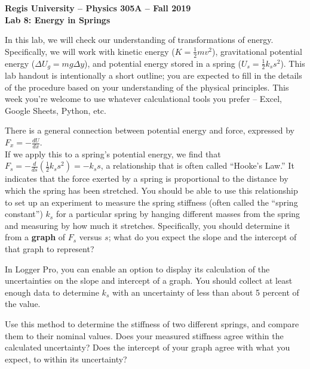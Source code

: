 \documentclass[12pt]{article}
\begin{document}
\begin{center}
{\bf{Regis University -- Physics 305A -- Fall 2019}} \\
{\bf{Lab 8: Energy in Springs}} \\
\medskip
\end{center}

\medskip

In this lab, we will check our understanding of transformations of 
energy. Specifically, we will work with kinetic 
energy ($K = \frac{1}{2} m v^2$), gravitational potential 
energy ($\Delta U_g = m g \Delta y$), and potential energy stored in a 
spring ($U_s = \frac{1}{2} k_s s^2$).  This lab handout is 
intentionally a short outline; you are expected to fill in the 
details of the procedure based on your understanding of the physical
principles. This week you're welcome to use whatever calculational tools you prefer -- Excel, Google Sheets, Python, etc.

\bigskip


\medskip

There is a general connection between potential energy and force,
expressed by $F_x = - \frac{d U} {d x}$.  \\
If we apply this to a spring's potential energy, we find that 
$F_s = - \frac{d}{d s} (\frac{1}{2} k_s s^2) = - k_s s$, a relationship
that is often called ``Hooke's Law.''  It indicates that the force
exerted by a spring is proportional to the distance by which the spring
has been stretched.
You should be able to use this relationship to set up an experiment 
to measure the spring stiffness (often called the ``spring constant'') 
$k_s$ for a particular spring by 
hanging different masses from the spring and measuring by how much it
stretches.  Specifically, you should determine it from a {\bf graph} of 
$F_s$ versus $s$; what do you expect the slope and the intercept of 
that graph to represent?

In Logger Pro, you can enable an option to display its calculation of 
the uncertainties on the slope and intercept of a graph.  You should collect at 
least enough data to determine $k_s$ with an uncertainty of less than about
5 percent of the value.

Use this method to determine the stiffness of two different springs, 
and compare them to their nominal values.  Does your measured stiffness
agree within the calculated uncertainty?  Does the intercept of your graph 
agree with what you expect, to within its uncertainty?
\end{document}
